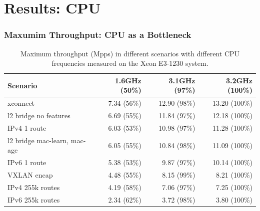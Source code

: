 \section{Results: CPU}


\begin{frame}
    \frametitle{Maxumim Throughput: CPU as a Bottleneck}
    \begin{table}[!ht]
        \vspace{5ex}
        \begin{tabular}[]{ l r r r }
            Scenario & 1.6GHz (50\%) & 3.1GHz (97\%)  & 3.2GHz (100\%) \\ 
            \midrule
            xconnect & 7.34 (56\%) & 12.90 (98\%) & 13.20 (100\%) \\ %
            l2 bridge no features & 6.69 (55\%) & 11.84 (97\%) & 12.18 (100\%) \\ %
            IPv4 1 route & 6.03 (53\%) & 10.98 (97\%) & 11.28 (100\%) \\ %
            l2 bridge mac-learn, mac-age & 6.05 (55\%) & 10.84 (98\%) & 11.09 (100\%) \\ %
            IPv6 1 route & 5.38 (53\%) & 9.87 (97\%) & 10.14 (100\%) \\ %
            VXLAN encap & 4.48 (55\%) & 8.15 (99\%) & 8.21 (100\%) \\ %
            IPv4 255k routes & 4.19 (58\%) & 7.06 (97\%) & 7.25 (100\%) \\ %
            IPv6 255k routes & 2.34 (62\%) & 3.72 (98\%) & 3.80 (100\%) \\ %
            \midrule
        \end{tabular}
        \caption{Maximum throughput (Mpps) in different scenarios with different CPU frequencies measured on the Xeon E3-1230 system. }
        \label{bottleneck}
    \end{table}
\end{frame}

